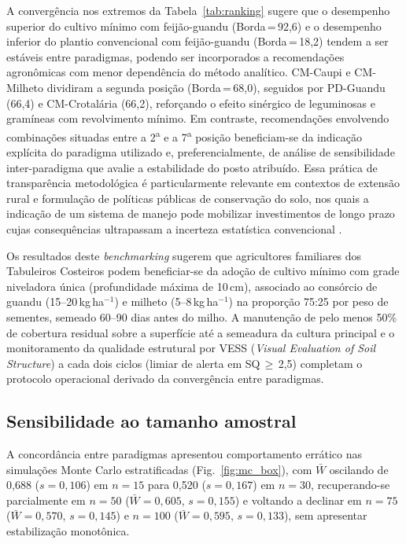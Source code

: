 \documentclass[pdflatex,sn-basic]{sn-jnl}%
\begin{document}
A convergência nos extremos da Tabela~\ref{tab:ranking} sugere que o desempenho superior do cultivo mínimo com feijão-guandu (Borda\,=\,92,6) e o desempenho inferior do plantio convencional com feijão-guandu (Borda\,=\,18,2) tendem a ser estáveis entre paradigmas, podendo ser incorporados a recomendações agronômicas com menor dependência do método analítico. CM-Caupi e CM-Milheto dividiram a segunda posição (Borda\,=\,68,0), seguidos por PD-Guandu (66,4) e CM-Crotalária (66,2), reforçando o efeito sinérgico de leguminosas e gramíneas com revolvimento mínimo. Em contraste, recomendações envolvendo combinações situadas entre a 2\textsuperscript{a} e a 7\textsuperscript{a} posição beneficiam-se da indicação explícita do paradigma utilizado e, preferencialmente, de análise de sensibilidade inter-paradigma que avalie a estabilidade do posto atribuído. Essa prática de transparência metodológica é particularmente relevante em contextos de extensão rural e formulação de políticas públicas de conservação do solo, nos quais a indicação de um sistema de manejo pode mobilizar investimentos de longo prazo cujas consequências ultrapassam a incerteza estatística convencional \citep{Majid2025}. 

Os resultados deste \textit{benchmarking} sugerem que agricultores familiares dos Tabuleiros Costeiros podem beneficiar-se da adoção de cultivo mínimo com grade niveladora única (profundidade máxima de 10\,cm), associado ao consórcio de guandu (15--20\,kg\,ha$^{-1}$) e milheto (5--8\,kg\,ha$^{-1}$) na proporção 75:25 por peso de sementes, semeado 60--90 dias antes do milho. A manutenção de pelo menos 50\% de cobertura residual sobre a superfície até a semeadura da cultura principal e o monitoramento da qualidade estrutural por VESS (\textit{Visual Evaluation of Soil Structure}) a cada dois ciclos (limiar de alerta em SQ\,$\geq$\,2,5) completam o protocolo operacional derivado da convergência entre paradigmas.

\subsection{Sensibilidade ao tamanho amostral}\label{subsec:sensitivity_disc}

A concordância entre paradigmas apresentou comportamento errático nas simulações Monte Carlo estratificadas (Fig.~\ref{fig:mc_box}), com $\bar{W}$ oscilando de 0{,}688 ($s = 0{,}106$) em $n = 15$ para 0{,}520 ($s = 0{,}167$) em $n = 30$, recuperando-se parcialmente em $n = 50$ ($\bar{W} = 0{,}605$, $s = 0{,}155$) e voltando a declinar em $n = 75$ ($\bar{W} = 0{,}570$, $s = 0{,}145$) e $n = 100$ ($\bar{W} = 0{,}595$, $s = 0{,}133$), sem apresentar estabilização monotônica.
\end{document}
